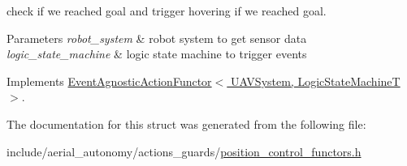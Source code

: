 check if we reached goal and trigger hovering if we reached goal. 


\begin{DoxyParams}{Parameters}
{\em robot\-\_\-system} & robot system to get sensor data \\
\hline
{\em logic\-\_\-state\-\_\-machine} & logic state machine to trigger events \\
\hline
\end{DoxyParams}


Implements \hyperlink{structEventAgnosticActionFunctor_a53a48938d68370ff2ef262222565ffcf}{Event\-Agnostic\-Action\-Functor$<$ U\-A\-V\-System, Logic\-State\-Machine\-T $>$}.



The documentation for this struct was generated from the following file\-:\begin{DoxyCompactItemize}
\item 
include/aerial\-\_\-autonomy/actions\-\_\-guards/\hyperlink{position__control__functors_8h}{position\-\_\-control\-\_\-functors.\-h}\end{DoxyCompactItemize}
